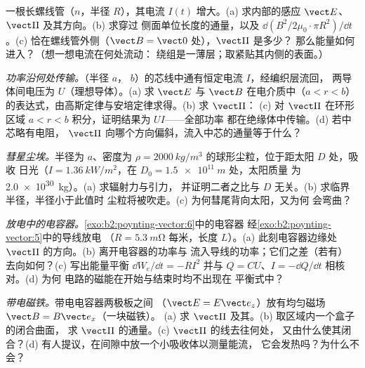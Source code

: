 \begin{exercise}[$\star\star$]\label{exo:b2:poynting-vector:7}
一根长螺线管（$n$，半径 $R$），其电流 $I(t)$ 增大。(a)
求内部的感应 $\vect E$、$\vect\Pi$ 及其方向。(b) 求穿过
侧面单位长度的通量，以及 $\dd(B^2/2\mu_0\cdot\pi R^2)/\dd t$。(c)
恰在螺线管外侧（$\vect B = \vect 0$ 处），$\vect\Pi$ 是多少？
那么能量如何进入？（想一想电流在何处流动：
绕组是一薄层；取紧贴其内侧的表面。）
\end{exercise}

\begin{exercise}[$\star\star$]\label{exo:b2:poynting-vector:8}
\emph{功率沿何处传输。}（半径 $a$，
$b$）的芯线中通有恒定电流 $I$，经编织层流回，
两导体间电压为 $U$（理想导体）。(a) 求 $\vect E$ 与 $\vect B$
在电介质中（$a < r < b$）的表达式，由高斯定律与安培定律求得。(b) 求 $\vect\Pi$：
(c) 对 $\vect\Pi$ 在环形区域 $a < r
< b$ 积分，证明结果为 $UI$——全部功率
都在绝缘体中传输。(d) 若中芯略有电阻，
$\vect\Pi$ 向哪个方向偏斜，流入中芯的通量等于什么？
\end{exercise}

\begin{exercise}[$\star\star$]\label{exo:b2:poynting-vector:9}
\emph{彗星尘埃。}半径为 $a$、密度为
$\rho = \qty{2000}{kg/m^3}$ 的球形尘粒，位于距太阳 $D$ 处，吸收
日光（$I = \qty{1.36}{kW/m^2}$，在 $D_0 = \qty{1.5e11}{m}$ 处，太阳质量
为 \qty{2.0e30}{kg}）。(a) 求辐射力与引力，
并证明二者之比与 $D$ 无关。(b) 求临界半径，半径小于此值时
尘粒将被吹走。(c) 为何彗尾背向太阳，又为何
会弯曲？
\end{exercise}

\begin{exercise}[$\star\star\star$]\label{exo:b2:poynting-vector:10}
\emph{放电中的电容器。}\cref{exo:b2:poynting-vector:6}中的电容器
经\cref{exo:b2:poynting-vector:5}中的导线放电
（$R = \qty{5.3}{m\ohm}$ 每米，长度
$L$）。(a) 此刻电容器边缘处 $\vect\Pi$ 的方向。(b) 离开电容器的功率与
流入导线的功率；它们之差（若有）
去向如何？(c) 写出能量平衡 $\dd W_e/\dd t = -RI^2$
并与 $Q = CU$、$I = -\dd Q/\dd t$ 相核对。(d) 为何
电路的磁能在开始与结束时均不出现在
平衡式中？
\end{exercise}

\begin{exercise}[$\star\star\star$]\label{exo:b2:poynting-vector:11}
\emph{带电磁铁。}带电电容器两极板之间
（$\vect E = E\vect e_z$）放有均匀磁场 $\vect B = B\vect e_x$（一块磁铁）。
(a) 求 $\vect\Pi$ 及其。(b) 取区域内一个盒子的闭合曲面，
求 $\vect\Pi$ 的通量。(c) $\vect\Pi$ 的线去往何处，
又由什么使其闭合？(d) 有人提议，在间隙中放一个小吸收体以测量能流，
它会发热吗？为什么不会？
\end{exercise}

